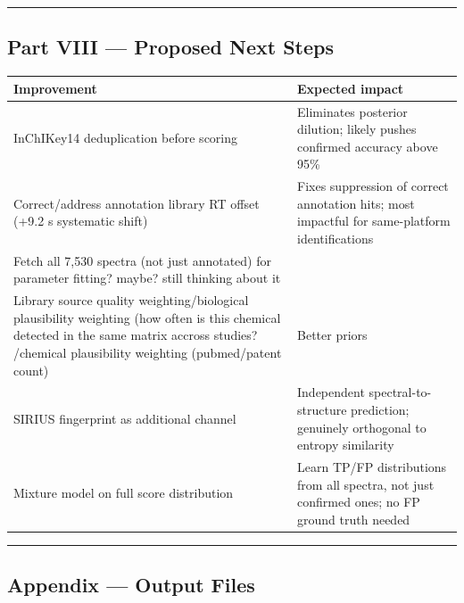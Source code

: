 \begin{center}\rule{0.5\linewidth}{0.5pt}\end{center}

\subsection{Part VIII --- Proposed Next
Steps}\label{part-viii-proposed-next-steps}

{\def\LTcaptype{none} %
\begin{longtable}[]{@{}
  >{\raggedright\arraybackslash}p{}
  >{\raggedright\arraybackslash}p{}@{}}
\toprule\noalign{}
\begin{minipage}[b]{\linewidth}\raggedright
Improvement
\end{minipage} & \begin{minipage}[b]{\linewidth}\raggedright
Expected impact
\end{minipage} \\
\midrule\noalign{}
\endhead
\bottomrule\noalign{}
\endlastfoot
InChIKey14 deduplication before scoring & Eliminates posterior dilution;
likely pushes confirmed accuracy above 95\% \\
Correct/address annotation library RT offset (+9.2 s systematic shift) &
Fixes suppression of correct annotation hits; most impactful for
same-platform identifications \\
Fetch all 7,530 spectra (not just annotated) for parameter fitting?
maybe? still thinking about it & \\
Library source quality weighting/biological plausibility weighting (how
often is this chemical detected in the same matrix accross studies?
/chemical plausibility weighting (pubmed/patent count) & Better
priors \\
SIRIUS fingerprint as additional channel & Independent
spectral-to-structure prediction; genuinely orthogonal to entropy
similarity \\
Mixture model on full score distribution & Learn TP/FP distributions
from all spectra, not just confirmed ones; no FP ground truth needed \\
\end{longtable}
}

\begin{center}\rule{0.5\linewidth}{0.5pt}\end{center}

\subsection{Appendix --- Output Files}\label{appendix-output-files}


